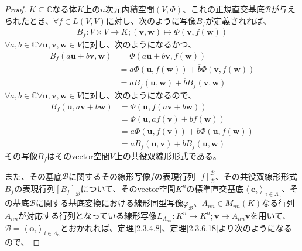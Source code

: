 \documentclass[dvipdfmx]{jsarticle}
\begin{document}
\begin{proof}
$K \subseteq \mathbb{C}$なる体$K$上の$n$次元内積空間$(V,\varPhi)$、これの正規直交基底$\mathcal{B}$が与えられたとき、$\forall f \in L(V,V)$に対し、次のように写像$B_{f}$が定義されれば、
\begin{align*}
B_{f}:V \times V \rightarrow K;\left( \mathbf{v},\mathbf{w} \right) \mapsto \varPhi\left( \mathbf{v},f\left( \mathbf{w} \right) \right)
\end{align*}
$\forall a,b \in \mathbb{C}\forall\mathbf{u},\mathbf{v},\mathbf{w} \in V$に対し、次のようになるかつ、
\begin{align*}
B_{f}\left( a\mathbf{u} + b\mathbf{v},\mathbf{w} \right) &= \varPhi\left( a\mathbf{u} + b\mathbf{v},f\left( \mathbf{w} \right) \right)\\
&= \overline{a}\varPhi\left( \mathbf{u},f\left( \mathbf{w} \right) \right) + \overline{b}\varPhi\left( \mathbf{v},f\left( \mathbf{w} \right) \right)\\
&= \overline{a}B_{f}\left( \mathbf{u},\mathbf{w} \right) + \overline{b}B_{f}\left( \mathbf{v},\mathbf{w} \right)
\end{align*}
$\forall a,b \in \mathbb{C}\forall\mathbf{u},\mathbf{v},\mathbf{w} \in V$に対し、次のようになるので、
\begin{align*}
B_{f}\left( \mathbf{u},a\mathbf{v} + b\mathbf{w} \right) &= \varPhi\left( \mathbf{u},f\left( a\mathbf{v} + b\mathbf{w} \right) \right)\\
&= \varPhi\left( \mathbf{u},af\left( \mathbf{v} \right) + bf\left( \mathbf{w} \right) \right)\\
&= a\varPhi\left( \mathbf{u},f\left( \mathbf{v} \right) \right) + b\varPhi\left( \mathbf{u},f\left( \mathbf{w} \right) \right)\\
&= aB_{f}\left( \mathbf{u},\mathbf{v} \right) + bB_{f}\left( \mathbf{u},\mathbf{w} \right)
\end{align*}
その写像$B_{f}$はそのvector空間$V$上の共役双線形形式である。\par
また、その基底$\mathcal{B}$に関するその線形写像$f$の表現行列$[ f]_{\mathcal{B}}^{\mathcal{B}}$、その共役双線形形式$B_{f}$の表現行列$\left[ B_{f} \right]_{\mathcal{B}}$について、そのvector空間$K^{n}$の標準直交基底$\left\langle \mathbf{e}_{i} \right\rangle_{i \in \varLambda_{n}}$、その基底$\mathcal{B}$に関する基底変換における線形同型写像$\varphi_{\mathcal{B}}$、$A_{nn} \in M_{nn}(K)$なる行列$A_{nn}$が対応する行列となっている線形写像$L_{A_{nn}}:K^{n} \rightarrow K^{n};\mathbf{v} \mapsto A_{nn}\mathbf{v}$を用いて、$\mathcal{B} =\left\langle \mathbf{o}_{i} \right\rangle_{i \in \varLambda_{n}}$とおかれれば、定理\ref{2.3.4.8}、定理\ref{2.3.6.18}より次のようになるので、

\end{proof}
\end{document}
